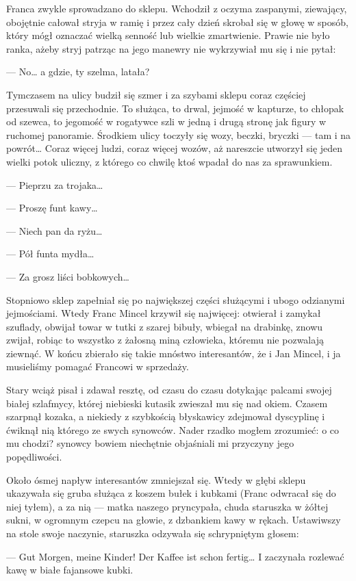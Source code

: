 \documentclass{book}
\begin{document}
Franca zwykle sprowadzano do sklepu. Wchodził z oczyma zaspanymi, ziewający, obojętnie całował stryja w ramię i przez cały dzień skrobał się w głowę w sposób, który mógł oznaczać wielką senność lub wielkie zmartwienie. Prawie nie było ranka, ażeby stryj patrząc na jego manewry nie wykrzywiał mu się i nie pytał:

— No… a gdzie, ty szelma, latała?

Tymczasem na ulicy budził się szmer i za szybami sklepu coraz częściej przesuwali się przechodnie. To służąca, to drwal, jejmość w kapturze, to chłopak od szewca, to jegomość w rogatywce szli w jedną i drugą stronę jak figury w ruchomej panoramie. Środkiem ulicy toczyły się wozy, beczki, bryczki — tam i na powrót… Coraz więcej ludzi, coraz więcej wozów, aż nareszcie utworzył się jeden wielki potok uliczny, z którego co chwilę ktoś wpadał do nas za sprawunkiem.

— Pieprzu za trojaka…

— Proszę funt kawy…

— Niech pan da ryżu…

— Pół funta mydła…

— Za grosz liści bobkowych…

Stopniowo sklep zapełniał się po największej części służącymi i ubogo odzianymi jejmościami. Wtedy Franc Mincel krzywił się najwięcej: otwierał i zamykał szuflady, obwijał towar w tutki z szarej bibuły, wbiegał na drabinkę, znowu zwijał, robiąc to wszystko z żałosną miną człowieka, któremu nie pozwalają ziewnąć. W końcu zbierało się takie mnóstwo interesantów, że i Jan Mincel, i ja musieliśmy pomagać Francowi w sprzedaży.

Stary wciąż pisał i zdawał resztę, od czasu do czasu dotykając palcami swojej białej szlafmycy, której niebieski kutasik zwieszał mu się nad okiem. Czasem szarpnął kozaka, a niekiedy z szybkością błyskawicy zdejmował dyscyplinę i ćwiknął nią którego ze swych synowców. Nader rzadko mogłem zrozumieć: o co mu chodzi? synowcy bowiem niechętnie objaśniali mi przyczyny jego popędliwości.

Około ósmej napływ interesantów zmniejszał się. Wtedy w głębi sklepu ukazywała się gruba służąca z koszem bułek i kubkami (Franc odwracał się do niej tyłem), a za nią — matka naszego pryncypała, chuda staruszka w żółtej sukni, w ogromnym czepcu na głowie, z dzbankiem kawy w rękach. Ustawiwszy na stole swoje naczynie, staruszka odzywała się schrypniętym głosem:

— Gut Morgen, meine Kinder! Der Kaffee ist schon fertig…
I zaczynała rozlewać kawę w białe fajansowe kubki.
\end{document}
